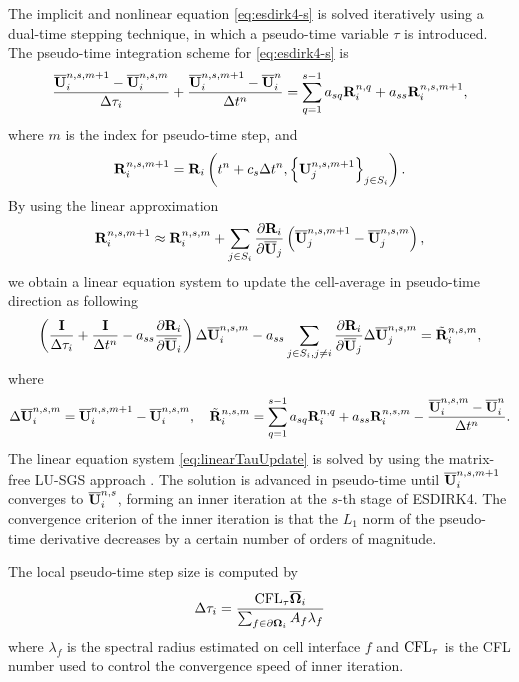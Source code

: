 The implicit and nonlinear equation \eqref{eq:esdirk4-s} is solved iteratively using a dual-time stepping technique, in which a pseudo-time variable $\tau$ is introduced. The pseudo-time integration scheme for  \eqref{eq:esdirk4-s} is
\begin{equation}
    \dfrac{\overline{\mathbf{U}}^{n,s,m+1}_i-\overline{\mathbf{U}}^{n,s,m}_i}{\mathrm\Delta \tau_i} + \dfrac{\overline{\mathbf{U}}^{n,s,m+1}_i - \overline{\mathbf{U}}^{n}_i}{\mathrm\Delta t^n} = \sum_{q=1}^{s-1} a_{sq} \mathbf{R}^{n,q}_i + a_{ss} \mathbf{R}_i^{n,s,m+1},
\end{equation}
where $m$ is the index for pseudo-time step, and
\begin{equation}
    \mathbf{R}^{n,s,m+1}_i  = \mathbf{R}_i \left(t^n + c_s \mathrm\Delta t^n, \left\{\mathbf{U}^{n,s,m+1}_j\right\}_{j \in S_i}\right).
\end{equation}
By using the linear approximation
\begin{equation}
    \mathbf{R}^{n,s,m+1}_i \approx \mathbf{R}^{n,s,m}_i + \sum_{j \in S_i} \dfrac{\partial \mathbf{R}_i}{\partial \overline{\mathbf{U}}_j} \left(\overline{\mathbf{U}}^{n,s,m+1}_j-\overline{\mathbf{U}}^{n,s,m}_j\right),
\end{equation}
we obtain a linear equation system to update the cell-average in pseudo-time direction as following
\begin{equation}
    \left(\frac{\eye}{\inc \tau_i} + \frac{\eye}{\inc t^n} -a_{ss}\partialderivative{\R_i }{\uu_i} \right) \inc \uu^{n,s, m}_i
    -
    a_{ss}\sum_{j\in S_i,j\neq i} {
        \partialderivative{\R_i}{\uu_j} \inc \uu^{n,s, m}_j
    }
    = \tilde{\R}^{n,s,m}_i,
    \label{eq:linearTauUpdate}
\end{equation}
where
\begin{equation}
    \label{eq:define-inc}
    \mathrm\Delta \overline{\mathbf{U}}^{n,s,m}_i= \overline{\mathbf{U}}^{n,s,m + 1}_i - \overline{\mathbf{U}}^{n,s,m}_i, \quad \tilde{\mathbf{R}}^{n,s,m}_i= \sum_{q=1}^{s-1} a_{sq} \mathbf{R}^{n,q}_i + a_{ss} \mathbf{R}_i^{n,s,m} - \dfrac{\overline{\mathbf{U}}^{n,s,m}_i - \overline{\mathbf{U}}^{n}_i}{\mathrm\Delta t^n}.
\end{equation}
The linear equation system \eqref{eq:linearTauUpdate} is solved by using the matrix-free LU-SGS approach \cite{luo1998fast}. The solution is advanced in pseudo-time until $\overline{\mathbf{U}}^{n,s,m+1}_{i}$ converges to $\overline{\mathbf{U}}^{n,s}_{i}$, forming an inner iteration at the $s$-th stage of ESDIRK4. The convergence criterion of the inner iteration is that the $L_1$ norm of the pseudo-time derivative decreases by a certain number of orders of magnitude.

The local pseudo-time step size is computed by
\begin{equation}
    \mathrm\Delta \tau_{i} = \frac{\text{CFL}_\tau \overline{\mathbf{\Omega}}_i }
    {\sum_{f \in \partial \mathbf{\Omega}_i}{A_f}\lambda_{f}}
\end{equation}
where $\lambda_{f}$ is the spectral radius estimated on cell interface $f$ and $\text{CFL}_\tau$ is the CFL number used to control the convergence speed of inner iteration.


